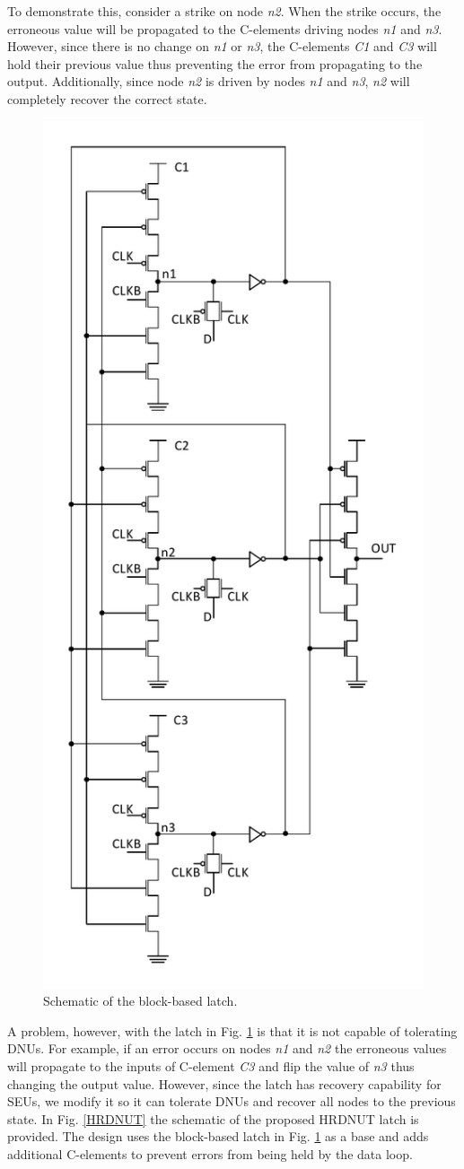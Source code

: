 To demonstrate this, consider a strike on node \textit{n2}. When the strike occurs, the erroneous value will be propagated to the C-elements driving nodes \textit{n1} and \textit{n3}. However, since there is no change on \textit{n1} or \textit{n3}, the C-elements \textit{C1} and \textit{C3} will hold their previous value thus preventing the error from propagating to the output. Additionally, since node \textit{n2} is driven by nodes \textit{n1} and \textit{n3}, \textit{n2} will completely recover the correct state. 

\begin{figure}[!htbp]
	\centering
	\includegraphics[width=0.55\linewidth]{Figures/BLatch}
	\caption{Schematic of the block-based latch.}
	\label{BLatch}
\end{figure} 

A problem, however, with the latch in Fig. \ref{BLatch} is that it is not capable of tolerating DNUs. For example, if an error occurs on nodes \textit{n1} and \textit{n2} the erroneous values will propagate to the inputs of C-element \textit{C3} and flip the value of \textit{n3} thus changing the output value. However, since the latch has recovery capability for SEUs, we modify it so it can tolerate DNUs and recover all nodes to the previous state. In Fig. \ref{HRDNUT} the schematic of the proposed HRDNUT latch is provided. The design uses the block-based latch in Fig. \ref{BLatch} as a base and adds additional C-elements to prevent errors from being held by the data loop.  

